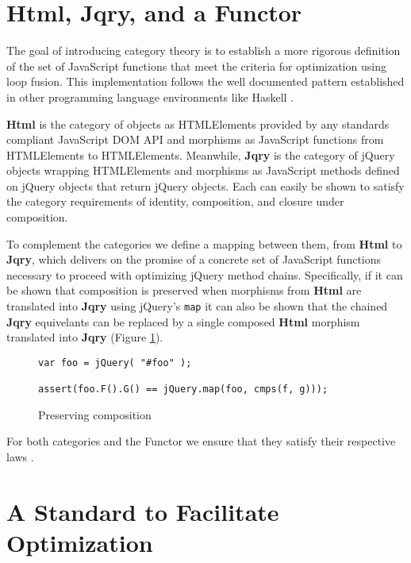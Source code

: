 \documentclass[preprint]{sigplanconf}
\begin{document}
\section{Html, Jqry, and a Functor}

The goal of introducing category theory is to establish a more rigorous definition of the set of JavaScript functions that meet the criteria for optimization using loop fusion. This implementation follows the well documented pattern established in other programming language environments like Haskell \cite[p. ~90]{bib:haskell-functor}.

\textbf{Html} is the category of objects as HTMLElements provided by any standards compliant JavaScript DOM API \cite{bib:htmlelement, bib:all-htmlelements} and morphisms as JavaScript functions from HTMLElements to HTMLElements. Meanwhile, \textbf{Jqry} is the category of jQuery objects wrapping HTMLElements and morphisms as JavaScript methods defined on jQuery objects that return jQuery objects. Each can easily be shown to satisfy the category requirements of identity, composition, and closure under composition.

To complement the categories we define a mapping between them, from \textbf{Html} to \textbf{Jqry}, which delivers on the promise of a concrete set of JavaScript functions necessary to proceed with optimizing jQuery method chains. Specifically, if it can be shown that composition is preserved when morphisms from \textbf{Html} are translated into \textbf{Jqry} using jQuery's \verb|map| it can also be shown that the chained \textbf{Jqry} equivelants can be replaced by a single composed \textbf{Html} morphism translated into \textbf{Jqry} (Figure \ref{fig:compose}).

\begin{figure}
\small
\begin{verbatim}
var foo = jQuery( "#foo" );

assert(foo.F().G() == jQuery.map(foo, cmps(f, g)));
\end{verbatim}
\nocaptionrule \caption{Preserving composition}
\label{fig:compose}
\end{figure}

For both categories and the Functor we ensure that they satisfy their respective laws \cite[p. ~1]{bib:category-definition}.

\section{A Standard to Facilitate Optimization}
\end{document}
